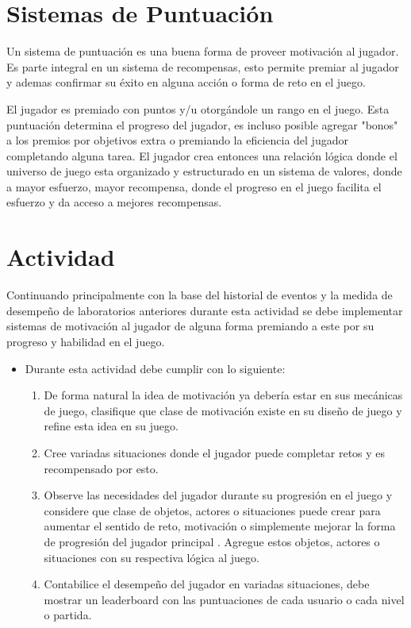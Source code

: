 \section{Sistemas de Puntuación}
Un sistema de puntuación es una buena forma de proveer motivación al jugador.  Es parte integral en un sistema de recompensas, esto permite premiar al jugador y ademas confirmar su éxito en alguna acción o forma de reto en el juego.

El jugador es premiado con puntos y/u otorgándole un rango en el juego. Esta puntuación determina el progreso del jugador, es incluso posible agregar "bonos" a los premios por objetivos extra o premiando la eficiencia del jugador completando alguna tarea. El jugador crea entonces una relación lógica donde el universo de juego esta organizado y estructurado en un sistema de valores, donde a mayor esfuerzo, mayor recompensa, donde el progreso en el juego facilita el esfuerzo y da acceso a mejores recompensas.
\section{Actividad}
Continuando principalmente con la base del historial de eventos y la medida de desempeño de laboratorios anteriores durante esta actividad se debe implementar sistemas de motivación al jugador de alguna forma premiando a este por su progreso y habilidad en el juego.
\begin{itemize}
\item Durante esta actividad debe cumplir con lo siguiente:
\begin{enumerate}
  \item De forma natural la idea de motivación ya debería estar en sus mecánicas de juego, clasifique que clase de motivación existe en su diseño de juego y refine esta idea en su juego.
  \item Cree variadas situaciones donde el jugador puede completar retos y es recompensado por esto.
  \item Observe las necesidades del jugador durante su progresión en el juego y considere que clase de objetos, actores o situaciones puede crear para aumentar el sentido de reto, motivación o simplemente mejorar la forma de progresión del jugador principal . Agregue estos objetos, actores o situaciones con su respectiva lógica al juego.
  \item Contabilice el desempeño del jugador en variadas situaciones, debe mostrar un leaderboard con las puntuaciones de cada usuario o cada nivel o partida.
\end{enumerate}
\end{itemize}